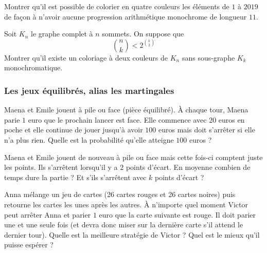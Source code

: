 \begin{exo}
Montrer qu'il est possible de colorier en quatre couleurs les éléments de $1$ à $2019$ de façon à n'avoir aucune progression arithmétique monochrome de longueur $11$.
\end{exo}


\begin{exo}
Soit $K_n$ le graphe complet à $n$ sommets. On suppose que
$$\binom n k < 2^{\binom k 2}$$
Montrer qu'il existe un coloriage à deux couleurs de $K_n$ sans sous-graphe $K_k$ monochromatique.
\end{exo}


\subsubsection{Les jeux équilibrés, alias les martingales}


\begin{exo}
Maena et Emile jouent à pile ou face (pièce équilibré). À chaque tour, Maena parie $1$ euro que le prochain lancer est face. Elle commence avec $20$ euros en poche et elle continue de jouer jusqu'à avoir $100$ euros mais doit s'arrêter si elle n'a plus rien. Quelle est la probabilité qu'elle atteigne $100$ euros ?
\end{exo}


\begin{exo}
Maena et Emile jouent de nouveau à pile ou face mais cette fois-ci comptent juste les points. Ils s'arrêtent lorsqu'il y a $2$ points d'écart. En moyenne combien de temps dure la partie ? Et s'ils s'arrêtent avec $k$ points d'écart ?
\end{exo}


\begin{exo}
Anna mélange un jeu de cartes (26 cartes rouges et 26 cartes noires) puis retourne les cartes les unes après les autres. À n'importe quel moment Victor peut arrêter Anna et
parier $1$ euro que la carte suivante est rouge. Il doit parier une et une seule fois (et devra donc miser sur la dernière carte s'il attend le dernier tour). Quelle est la meilleure stratégie de Victor ? Quel est le mieux qu'il puisse espérer ?
\end{exo}
